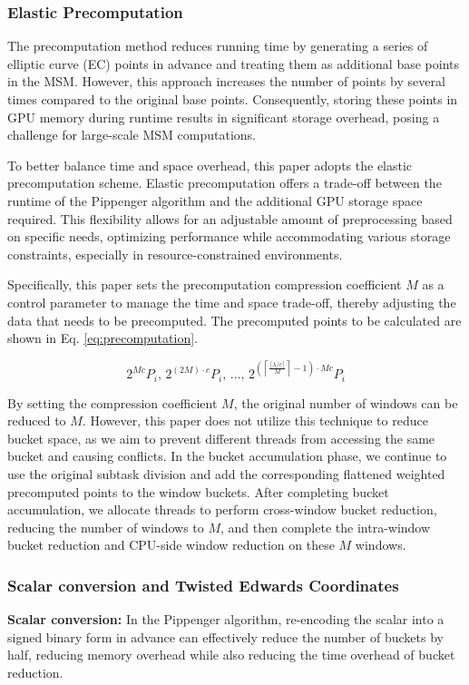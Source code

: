 \documentclass[journal=tches,final]{iacrtrans}
\begin{document}
\subsubsection{\textbf{Elastic Precomputation}}
The precomputation method reduces running time by generating a series of elliptic curve (EC) points in advance and treating them as additional base points in the MSM. However, this approach increases the number of points by several times compared to the original base points. Consequently, storing these points in GPU memory during runtime results in significant storage overhead, posing a challenge for large-scale MSM computations.

To better balance time and space overhead, this paper adopts the elastic precomputation scheme. Elastic precomputation offers a trade-off between the runtime of the Pippenger algorithm and the additional GPU storage space required. This flexibility allows for an adjustable amount of preprocessing based on specific needs, optimizing performance while accommodating various storage constraints, especially in resource-constrained environments.

Specifically, this paper sets the precomputation compression coefficient \( M \) as a control parameter to manage the time and space trade-off, thereby adjusting the data that needs to be precomputed. The precomputed points to be calculated are shown in Eq. \eqref{eq:precomputation}.

\begin{equation}
\label{eq:precomputation}
    2^{Mc} P_i, \, 2^{(2M) \cdot c} P_i, \, \ldots, \, 2^{\left(\left\lceil \frac{\lceil \lambda / c \rceil}{M} \right\rceil - 1\right) \cdot Mc} P_i
\end{equation}

By setting the compression coefficient $M$, the original number of windows can be reduced to $M$. However, this paper does not utilize this technique to reduce bucket space, as we aim to prevent different threads from accessing the same bucket and causing conflicts. In the bucket accumulation phase, we continue to use the original subtask division and add the corresponding flattened weighted precomputed points to the window buckets. After completing bucket accumulation, we allocate threads to perform cross-window bucket reduction, reducing the number of windows to $M$, and then complete the intra-window bucket reduction and CPU-side window reduction on these $M$ windows.


\subsubsection{\textbf{Scalar conversion and Twisted Edwards Coordinates}}
\textbf{Scalar conversion: } In the Pippenger algorithm, re-encoding the scalar into a signed binary form in advance can effectively reduce the number of buckets by half, reducing memory overhead while also reducing the time overhead of bucket reduction. 
\end{document}
